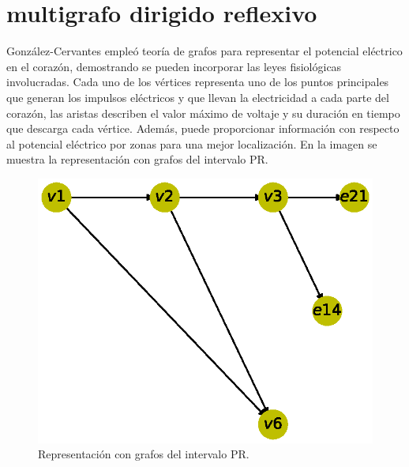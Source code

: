 \documentclass{article}
\begin{document}
\section{multigrafo dirigido reflexivo}
González-Cervantes \cite{gonzalez2016potencial} empleó teoría de grafos para representar el potencial eléctrico en el corazón, demostrando se pueden incorporar las leyes fisiológicas involucradas. Cada uno de los vértices representa uno de los puntos principales que generan los impulsos eléctricos y que llevan la electricidad a
cada parte del corazón, las aristas describen el valor máximo de voltaje y su
duración en tiempo que descarga cada vértice. Además, puede proporcionar información con respecto al potencial eléctrico por zonas para una mejor localización.
En la imagen se muestra la representación con grafos del intervalo PR.

\begin{figure}
  \centering 
  \includegraphics[width=.8\columnwidth]{12.eps}
  \caption{Representación con grafos del intervalo PR.}
  \label{fig:12}
\end{figure}


\newpage


\end{document}
